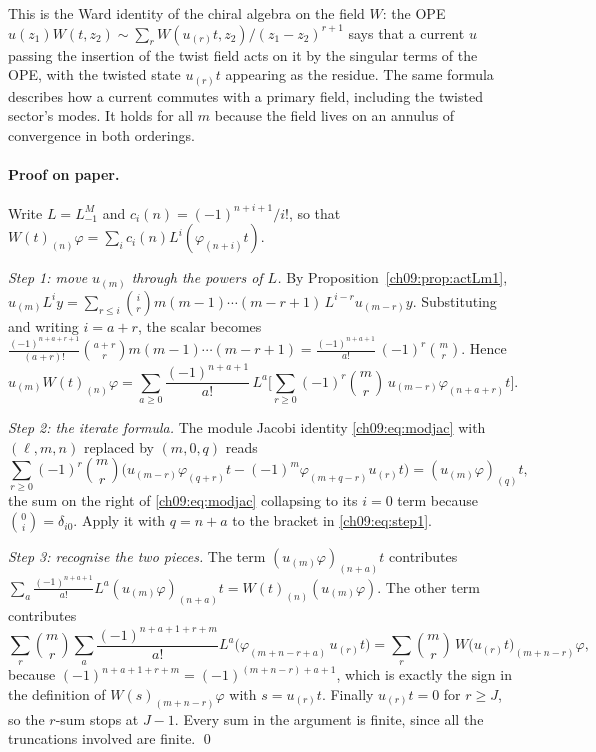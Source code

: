 \begin{physics}
This is the Ward identity of the chiral algebra on the field $W$: the OPE $u(z_1)W(t,z_2)\sim\sum_{r}W(u_{(r)}t,z_2)/(z_1-z_2)^{r+1}$ says that a current $u$ passing the insertion of the twist field acts on it by the singular terms of the OPE, with the twisted state $u_{(r)}t$ appearing as the residue. The same formula describes how a current commutes with a primary field, including the twisted sector's modes. It holds for all $m$ because the field lives on an annulus of convergence in both orderings.
\end{physics}

\paragraph{Proof on paper.} Write $L=L^M_{-1}$ and $c_i(n)=(-1)^{n+i+1}/i!$, so that
$W(t)_{(n)}\varphi=\sum_ic_i(n)L^i(\varphi_{(n+i)}t)$.

\emph{Step 1: move $u_{(m)}$ through the powers of $L$.} By Proposition~\ref{ch09:prop:actLm1},
$u_{(m)}L^iy=\sum_{r\le i}\binom ir m(m-1)\cdots(m-r+1)\,L^{i-r}u_{(m-r)}y$. Substituting and
writing $i=a+r$, the scalar becomes
$\frac{(-1)^{n+a+r+1}}{(a+r)!}\binom{a+r}{r}m(m-1)\cdots(m-r+1)=\frac{(-1)^{n+a+1}}{a!}\,(-1)^r\binom mr$.
Hence
\begin{equation}\label{ch09:eq:step1}
u_{(m)}W(t)_{(n)}\varphi=\sum_{a\ge0}\frac{(-1)^{n+a+1}}{a!}\,L^a\Big[\sum_{r\ge0}(-1)^r\binom mr\,u_{(m-r)}\varphi_{(n+a+r)}t\Big].
\end{equation}

\emph{Step 2: the iterate formula.} The module Jacobi identity \eqref{ch09:eq:modjac} with
$(\ell,m,n)$ replaced by $(m,0,q)$ reads
\begin{equation}\label{ch09:eq:iterate}
\sum_{r\ge0}(-1)^r\binom mr\Big(u_{(m-r)}\varphi_{(q+r)}t-(-1)^m\varphi_{(m+q-r)}u_{(r)}t\Big)=(u_{(m)}\varphi)_{(q)}t,
\end{equation}
the sum on the right of \eqref{ch09:eq:modjac} collapsing to its $i=0$ term because $\binom0i=\delta_{i0}$.
Apply it with $q=n+a$ to the bracket in \eqref{ch09:eq:step1}.

\emph{Step 3: recognise the two pieces.} The term $(u_{(m)}\varphi)_{(n+a)}t$ contributes
$\sum_a\frac{(-1)^{n+a+1}}{a!}L^a(u_{(m)}\varphi)_{(n+a)}t=W(t)_{(n)}(u_{(m)}\varphi)$. The other
term contributes
\begin{equation*}
\sum_{r}\binom mr\sum_a\frac{(-1)^{n+a+1+r+m}}{a!}L^a\big(\varphi_{(m+n-r+a)}\,u_{(r)}t\big)
=\sum_r\binom mr\,W\big(u_{(r)}t\big)_{(m+n-r)}\varphi ,
\end{equation*}
because $(-1)^{n+a+1+r+m}=(-1)^{(m+n-r)+a+1}$, which is exactly the sign in the definition of
$W(s)_{(m+n-r)}\varphi$ with $s=u_{(r)}t$. Finally $u_{(r)}t=0$ for $r\ge J$, so the $r$-sum
stops at $J-1$. Every sum in the argument is finite, since all the truncations involved are
finite. \qed

